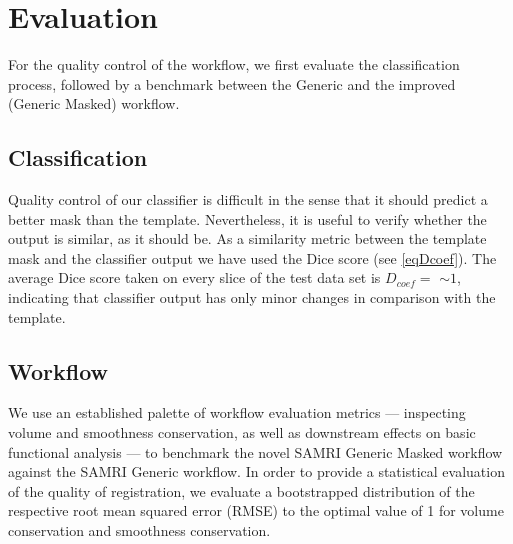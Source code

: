 \section{Evaluation}
For the quality control of the workflow, we first evaluate the classification process, followed by a benchmark between the Generic and the improved (Generic Masked) workflow.

\subsection{Classification}
Quality control of our classifier is difficult in the sense that it should predict a better mask than the template.
Nevertheless, it is useful to verify whether the output is similar, as it should be.
As a similarity metric between the template mask and the classifier output we have used the Dice score (see \cref{eqDcoef}).
The average Dice score taken on every slice of the test data set is $D_{coef}= $  $\sim 1$, indicating that classifier output has only minor changes in comparison with the template.

\begin{sansmath}
\end{sansmath}

\subsection{Workflow}
We use an established palette of workflow evaluation metrics --- inspecting volume and smoothness conservation, as well as downstream effects on basic functional analysis \cite{ioanas_optimized_2019} --- to benchmark the novel SAMRI Generic Masked workflow against the SAMRI Generic workflow.
In order to provide a statistical evaluation of the quality of registration, we evaluate a bootstrapped distribution of the respective root mean squared error (RMSE) to the optimal value of 1 for volume conservation and smoothness conservation.
